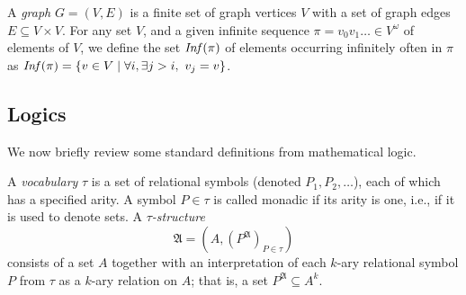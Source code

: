 \documentclass[a4paper,UKenglish,cleveref, autoref, thm-restate]{lipics-v2021}
\begin{document}
A {\em graph} $G=(V,E)$ is a finite set of graph vertices $V$ with a set of graph edges $E \subseteq V \times V$. 
%
For any set $V$, and a given infinite sequence $\pi = v_0 v_1 \ldots \in V^\omega$ of elements of $V$, we define the set 
$\text{\textit{Inf}}(\pi)$ of elements occurring infinitely often in $\pi$ as
$\text{\textit{Inf}}(\pi) = \{ v \in V \mid \forall i, \exists j > i, ~ v_j = v \}$. 



		\iffalse


\subsection{Logics}

We now brieﬂy review some standard deﬁnitions from mathematical logic.

\begin{samepage}
\begin{definition}
 A {\em vocabulary} $\tau$ is a set of relational symbols (denoted $P_1, P_2, \ldots $), each of which has a specified
 arity. A symbol $P \in \tau$ is called monadic if its arity is one, i.e., if it is used to
 denote sets.
%
A {\em $\tau$-structure} %
%
$$ \mathfrak{A} = (A,	( P^{\mathfrak{A}} )_{P \in \tau})$$
%
consists of a set $A$ together with an interpretation of
 each $k$-ary relational symbol $P$ from $\tau$ as a $k$-ary relation on $A$; that is, a
set $P^{\mathfrak{A}} \subseteq A^k$.
%
\end{definition}
\end{samepage}


\end{document}
